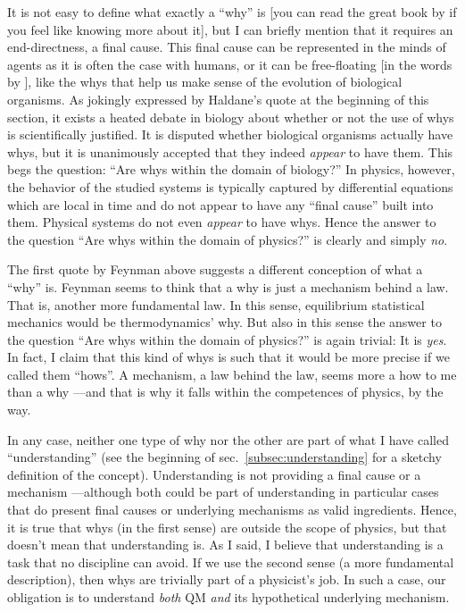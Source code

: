 \documentclass[a4paper,12pt]{article}
\begin{document}
It is not easy to define what exactly a ``why'' is [you can read the great
book by \cite{Deacon2012} if you feel like knowing more about it], but I can
briefly mention that it requires an end-directness, a final cause. This final
cause can be represented in the minds of agents as it is often the case with
humans, or it can be free-floating [in the words by \cite{Dennett1995}], like
the whys that help us make sense of the evolution of biological organisms. As
jokingly expressed by Haldane's quote at the beginning of this section, it
exists a heated debate in biology about whether or not the use of whys is
scientifically justified. It is disputed whether biological organisms actually
have whys, but it is unanimously accepted that they indeed \emph{appear} to
have them. This begs the question: ``Are whys within the domain of biology?''
In physics, however, the behavior of the studied systems is typically captured
by differential equations which are local in time and do not appear to have
any ``final cause'' built into them. Physical systems do not even
\emph{appear} to have whys. Hence the answer to the question ``Are whys within
the domain of physics?'' is clearly and simply \emph{no}.

The first quote by Feynman above suggests a different conception of what a
``why'' is. Feynman seems to think that a why is just a mechanism behind a
law. That is, another more fundamental law. In this sense, equilibrium
statistical mechanics would be thermodynamics' why. But also in this sense the
answer to the question ``Are whys within the domain of physics?'' is again
trivial: It is \emph{yes}. In fact, I claim that this kind of whys is such
that it would be more precise if we called them ``hows''. A mechanism, a law
behind the law, seems more a how to me than a why ---and that is why it falls
within the competences of physics, by the way.

In any case, neither one type of why nor the other are part of what I have
called ``understanding'' (see the beginning of sec.~\ref{subsec:understanding}
for a sketchy definition of the concept). Understanding is not providing a
final cause or a mechanism ---although both could be part of understanding in
particular cases that do present final causes or underlying mechanisms as
valid ingredients. Hence, it is true that whys (in the first sense) are
outside the scope of physics, but that doesn't mean that understanding is. As
I said, I believe that understanding is a task that no discipline can avoid.
If we use the second sense (a more fundamental description), then whys are
trivially part of a physicist's job. In such a case, our obligation is to
understand \emph{both} QM \emph{and} its hypothetical underlying mechanism.
\end{document}
